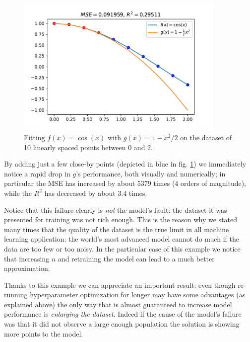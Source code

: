 \begin{figure}[H]
    \centering
    \includegraphics[width=0.9\textwidth]{img/molti_dati.pdf}
    \caption{Fitting $f(x)=\cos(x)$ with $g(x) = 1-x^2/2$ on the dataset of 10 linearly spaced points between $0$ and $2$.}
    \label{fig:molti_dati}
\end{figure}
By adding just a few close-by points (depicted in blue in fig. \ref{fig:molti_dati}) we immediately notice a rapid drop in $g$'s performance, both visually and numerically; in particular the MSE has increased by about $5379$ times ($4$ orders of magnitude), while the $R^2$ has decreased by about $3.4$ times.

Notice that this failure clearly is \emph{not} the model's fault: the dataset it was presented for training was not rich enough. This is the reason why we stated many times that the quality of the dataset is the true limit in all machine learning application: the world's most advanced model cannot do much if the data are too few or too noisy.
In the particular case of this example we notice that increasing $n$ and retraining the model can lead to a much better approximation.

Thanks to this example we can appreciate an important result: even though re-running hyperparameter optimization for longer may have some advantages (as explained above) the only way that is almost guaranteed to increase model performance is \emph{enlarging the dataset}. Indeed if the cause of the model's failure was that it did not observe a large enough population the solution is showing more points to the model.

